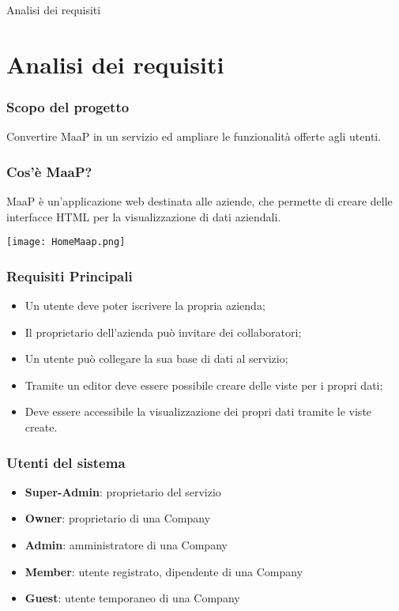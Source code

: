 \begin{frame}

\begin{center}
    \huge Analisi dei requisiti
\end{center}

\end{frame}

\section{Analisi dei requisiti}
\begin{frame}
  \frametitle{Scopo del progetto}

  \begin{center}
    Convertire MaaP in un servizio ed ampliare le funzionalità offerte agli utenti.
  \end{center}
\end{frame}

\begin{frame}
  \frametitle{Cos'è MaaP?}

  MaaP è un'applicazione web destinata alle aziende, che permette di creare delle interfacce HTML per la visualizzazione di dati aziendali.

   \texttt{[image: HomeMaap.png]}
  
\end{frame}

\begin{frame}
  \frametitle{Requisiti Principali}

  \begin{itemize}
  \item Un utente deve poter iscrivere la propria azienda;
  \item Il proprietario dell'azienda può invitare dei collaboratori;
  \item Un utente può collegare la sua base di dati al servizio;
  \item Tramite un editor deve essere possibile creare delle viste per i propri dati;
  \item Deve essere accessibile la visualizzazione dei propri dati tramite le viste create.
  \end{itemize}
\end{frame}


\begin{frame}
  \frametitle{Utenti del sistema}

  \begin{itemize}
  \item \textbf{Super-Admin}: proprietario del servizio
  \item \textbf{Owner}: proprietario di una Company
  \item \textbf{Admin}: amministratore di una Company
  \item \textbf{Member}: utente registrato, dipendente di una Company
  \item \textbf{Guest}: utente temporaneo di una Company
  \end{itemize}

\end{frame}

